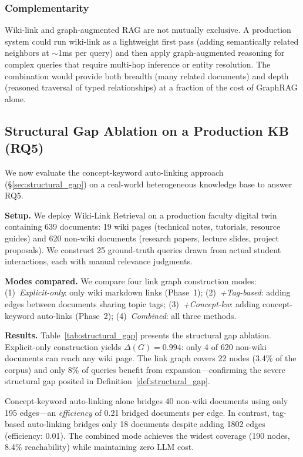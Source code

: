 \documentclass[sigconf,review]{acmart}
\newcommand{\sys}{Wiki-Link Retrieval\xspace}
\begin{document}
\subsubsection{Complementarity}
Wiki-link and graph-augmented RAG are
not mutually exclusive. A production system could run wiki-link as a
lightweight first pass (adding semantically related neighbors at ${\sim}$1ms
per query) and then apply graph-augmented reasoning for complex queries that
require multi-hop inference or entity resolution. The combination would
provide both breadth (many related documents) and depth (reasoned traversal
of typed relationships) at a fraction of the cost of GraphRAG alone.

\subsection{Structural Gap Ablation on a Production KB (RQ5)}
\label{sec:r5}

We now evaluate the concept-keyword auto-linking approach
(\S\ref{sec:structural_gap}) on a real-world heterogeneous knowledge base
to answer RQ5.

\textbf{Setup.}
We deploy \sys on a production faculty digital twin containing 639
documents: 19 wiki pages (technical notes, tutorials, resource guides)
and 620 non-wiki documents (research papers, lecture slides, project
proposals).  We construct 25 ground-truth queries drawn from actual
student interactions, each with manual relevance judgments.

\textbf{Modes compared.}
We compare four link graph construction modes:
(1)~\emph{Explicit-only}: only wiki markdown links (Phase~1);
(2)~\emph{+Tag-based}: adding edges between documents sharing topic tags;
(3)~\emph{+Concept-kw}: adding concept-keyword auto-links (Phase~2);
(4)~\emph{Combined}: all three methods.

\textbf{Results.}
Table~\ref{tab:structural_gap} presents the structural gap ablation.
Explicit-only construction yields $\Delta(G) = 0.994$: only 4 of 620
non-wiki documents can reach any wiki page.  The link graph covers
22 nodes (3.4\% of the corpus) and only 8\% of queries benefit from
expansion---confirming the severe structural gap posited in
Definition~\ref{def:structural_gap}.

Concept-keyword auto-linking alone bridges 40 non-wiki documents using
only 195 edges---an \emph{efficiency} of 0.21 bridged documents per edge.
In contrast, tag-based auto-linking bridges only 18 documents despite
adding 1802 edges (efficiency: 0.01).  The combined mode achieves
the widest coverage (190 nodes, 8.4\% reachability) while maintaining
zero LLM cost.
\end{document}
